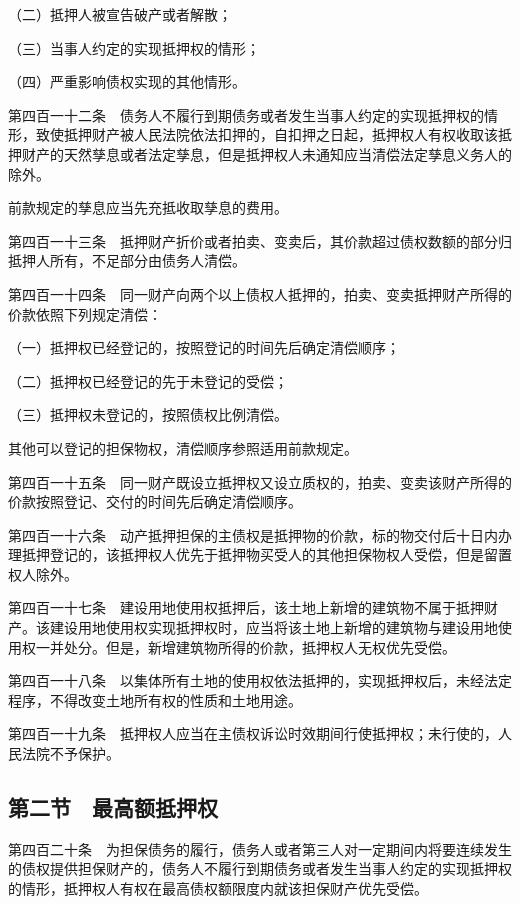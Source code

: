 \documentclass[UTF8,12pt,a4paper]{ctexbook}
\begin{document}
（二）抵押人被宣告破产或者解散；

（三）当事人约定的实现抵押权的情形；

（四）严重影响债权实现的其他情形。

第四百一十二条　债务人不履行到期债务或者发生当事人约定的实现抵押权的情形，致使抵押财产被人民法院依法扣押的，自扣押之日起，抵押权人有权收取该抵押财产的天然孳息或者法定孳息，但是抵押权人未通知应当清偿法定孳息义务人的除外。

前款规定的孳息应当先充抵收取孳息的费用。

第四百一十三条　抵押财产折价或者拍卖、变卖后，其价款超过债权数额的部分归抵押人所有，不足部分由债务人清偿。

第四百一十四条　同一财产向两个以上债权人抵押的，拍卖、变卖抵押财产所得的价款依照下列规定清偿：

（一）抵押权已经登记的，按照登记的时间先后确定清偿顺序；

（二）抵押权已经登记的先于未登记的受偿；

（三）抵押权未登记的，按照债权比例清偿。

其他可以登记的担保物权，清偿顺序参照适用前款规定。

第四百一十五条　同一财产既设立抵押权又设立质权的，拍卖、变卖该财产所得的价款按照登记、交付的时间先后确定清偿顺序。

第四百一十六条　动产抵押担保的主债权是抵押物的价款，标的物交付后十日内办理抵押登记的，该抵押权人优先于抵押物买受人的其他担保物权人受偿，但是留置权人除外。

第四百一十七条　建设用地使用权抵押后，该土地上新增的建筑物不属于抵押财产。该建设用地使用权实现抵押权时，应当将该土地上新增的建筑物与建设用地使用权一并处分。但是，新增建筑物所得的价款，抵押权人无权优先受偿。

第四百一十八条　以集体所有土地的使用权依法抵押的，实现抵押权后，未经法定程序，不得改变土地所有权的性质和土地用途。

第四百一十九条　抵押权人应当在主债权诉讼时效期间行使抵押权；未行使的，人民法院不予保护。

\subsection*{第二节　最高额抵押权}

第四百二十条　为担保债务的履行，债务人或者第三人对一定期间内将要连续发生的债权提供担保财产的，债务人不履行到期债务或者发生当事人约定的实现抵押权的情形，抵押权人有权在最高债权额限度内就该担保财产优先受偿。
\end{document}
